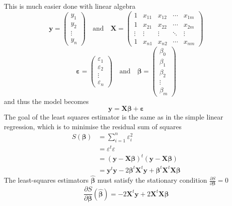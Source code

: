 \documentclass[11pt]{article}
\theoremstyle{definition}
\begin{document}
This is much easier done with linear algebra
\begin{equation*}
	\bm{y} = \begin{pmatrix}
		y_1\\y_2\\\vdots\\y_n
	\end{pmatrix} \quad\text{and}\quad \bm{X} = \begin{pmatrix}
		1 & x_{11} & x_{12} & \cdots & x_{1m}\\
		1 & x_{21} & x_{22} & \cdots & x_{2m}\\
		\vdots & \vdots & \vdots & \ddots & \vdots\\
		1 & x_{n1} & x_{n2} & \cdots & x_{nm}
	\end{pmatrix}
\end{equation*}
\begin{equation*}
	\bm{\varepsilon} = \begin{pmatrix}
		\varepsilon_1\\\varepsilon_2\\\vdots\\\varepsilon_n
	\end{pmatrix} \quad\text{and}\quad \bm{\beta} = \begin{pmatrix}
		\beta_0\\\beta_1\\\beta_2\\\vdots\\\beta_m
	\end{pmatrix}
\end{equation*}
and thus the model becomes
\begin{equation*}
	\bm{y} = \bm{X\beta + \varepsilon}
\end{equation*}
The goal of the least squares estimator is the same as in the simple linear regression, which is to minimise the residual sum of squares
\begin{align*}
	S(\bm{\beta}) &= \sum_{i=1}^{n}\varepsilon_i^2\\
	&= \varepsilon^t\varepsilon\\
	&= (\bm{y-X\beta})^t (\bm{y-X\beta})\\
	&= \bm{y}^t\bm{y} - 2\bm{\beta}^t\bm{X}^t\bm{y} + \bm{\beta}^t\bm{X}^t\bm{X\beta}
\end{align*}
The least-squares estimators $\hat{\bm{\beta}}$ must satisfy the stationary condition $\frac{\partial S}{\partial \bm{\beta}} = 0$
\begin{equation*}
	\frac{\partial S}{\partial \bm{\beta}}(\hat{\bm{\beta}}) = - 2\bm{X}^t\bm{y} + 2\bm{X}^t\bm{X\beta}
\end{equation*}
\end{document}

